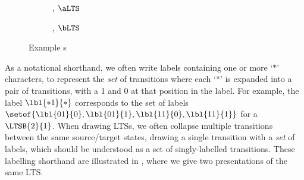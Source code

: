 \begin{figure}[ht]
    \centering
    \begin{subfigure}{0.5\textwidth}
        \centering
    \caption{, $\aLTS$}
    \end{subfigure}%
    \begin{subfigure}{0.5\textwidth}
    \centering
        \caption{, $\bLTS$}
    \end{subfigure}%
\caption{Example \TLTS{}s}
\label{fig:exampleTLTSs}
\end{figure}

As a notational shorthand, we often write \TLTS{} labels containing one or more
`$\ast$' characters, to represent the \emph{set} of transitions where each
`$\ast$' is expanded into a pair of transitions, with a 1 and 0 at that
position in the label. For example, the label $\lbl{\ast1}{\ast}$ corresponds
to the set of labels $\setof{\lbl{01}{0},\lbl{01}{1},\lbl{11}{0},\lbl{11}{1}}$
for a $\LTSB{2}{1}$. When drawing LTSs, we often collapse multiple transitions
between the same source/target states, drawing a single transition with a
\emph{set} of labels, which should be understood as a set of singly-labelled
transitions. These labelling shorthand are illustrated in
, where we give two presentations of the
same LTS\@.

